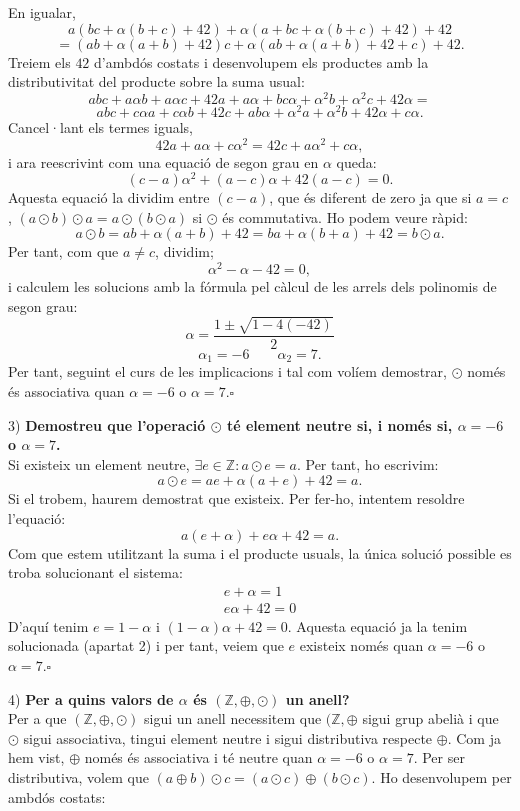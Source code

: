 \documentclass[11pt]{article}
\begin{document}
\begin{legal}
\begin{legal}
\begin{itemize}
		\end{itemize}
		En igualar,
		$$
		a(bc+\alpha(b+c)+42)+\alpha(a+bc+\alpha(b+c)+42)+42
		$$
		$$
		=(ab+\alpha(a+b)+42)c+\alpha(ab+\alpha(a+b)+42+c)+42.
		$$
		Treiem els $42$ d'ambdós costats i desenvolupem els productes amb la distributivitat del producte sobre la suma usual:
		$$
		abc+a\alpha b+a\alpha c+42a+a\alpha+bc\alpha+\alpha^2b+\alpha^2c+42\alpha=
		$$
		$$
		abc+c\alpha a+c\alpha b+42c+ab\alpha+\alpha^2a+\alpha^2b+42\alpha+c\alpha.
		$$
		Cancel·lant els termes iguals,
		$$
		42a+a\alpha +c\alpha^2=42c+a\alpha^2+c\alpha,
		$$
		i ara reescrivint com una equació de segon grau en $\alpha$ queda:
		$$
		(c-a)\alpha^2+(a-c)\alpha+42(a-c)=0.
		$$
		Aquesta equació la dividim entre $(c-a)$, que és diferent de zero ja que si $a=c$, $(a\odot b)\odot a=a\odot(b\odot a)$ si $\odot$ és commutativa. Ho podem veure ràpid:
		$$a\odot b=ab+\alpha(a+b)+42=ba+\alpha(b+a)+42=b\odot a.$$
		Per tant, com que $a\neq c$, dividim;
		$$
		\alpha^2-\alpha-42=0,
		$$
		i calculem les solucions amb la fórmula pel càlcul de les arrels dels polinomis de segon grau:
		$$
		\alpha=\dfrac{1\pm\sqrt{1-4(-42)}}{2}
		$$
		$$
		\alpha_1=-6\qquad\alpha_2=7.
		$$
		Per tant, seguint el curs de les implicacions i tal com volíem demostrar, $\odot$ només és associativa quan $\alpha=-6$ o $\alpha=7$.$\square$
		\item[3)] \textbf{Demostreu que l'operació $\odot$ té element neutre si, i només si, $\alpha=-6$ o $\alpha=7$.}\\
		Si existeix un element neutre, $\exists e\in\mathbb{Z}:a\odot e=a$. Per tant, ho escrivim:
		$$a\odot e=ae+\alpha(a+e)+42=a.$$
		Si el trobem, haurem demostrat que existeix. Per fer-ho, intentem resoldre l'equació:
		$$a(e+\alpha)+e\alpha+42=a.$$
		Com que estem utilitzant la suma i el producte usuals, la única solució possible es troba solucionant el sistema:
		\[		
		\begin{array}{rcl}
			e+\alpha=1\\
			e\alpha+42=0
		\end{array}
		\]
		D'aquí tenim $e=1-\alpha$ i $(1-\alpha)\alpha+42=0$. Aquesta equació ja la tenim solucionada (apartat 2) i per tant, veiem que $e$ existeix només quan $\alpha=-6$ o $\alpha=7$.$\square$
		\item[4)] \textbf{Per a quins valors de $\alpha$ és $(\mathbb{Z},\oplus,\odot)$ un anell?}\\
		Per a que $(\mathbb{Z},\oplus,\odot)$ sigui un anell necessitem que $(\mathbb{Z},\oplus$ sigui grup abelià i que $\odot$ sigui associativa, tingui element neutre i sigui distributiva respecte $\oplus$. Com ja hem vist, $\oplus$ només és associativa i té neutre quan $\alpha=-6$ o $\alpha=7$. Per ser distributiva, volem que $(a\oplus b)\odot c=(a\odot c)\oplus(b\odot c)$. Ho desenvolupem per ambdós costats:

\end{legal}
\end{legal}
\end{document}
